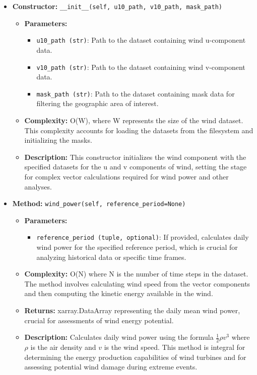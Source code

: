 \documentclass[a4paper,12pt]{article}
\begin{document}
\begin{itemize}
    \item \textbf{Constructor:} \texttt{\_\_init\_\_(self, u10\_path, v10\_path, mask\_path)}
    \begin{itemize}
        \item \textbf{Parameters:}
        \begin{itemize}
            \item \texttt{u10\_path (str)}: Path to the dataset containing wind u-component data.
            \item \texttt{v10\_path (str)}: Path to the dataset containing wind v-component data.
            \item \texttt{mask\_path (str)}: Path to the dataset containing mask data for filtering the geographic area of interest.
        \end{itemize}
        \item \textbf{Complexity:} O(W), where W represents the size of the wind dataset. This complexity accounts for loading the datasets from the filesystem and initializing the masks.
        \item \textbf{Description:} This constructor initializes the wind component with the specified datasets for the u and v components of wind, setting the stage for complex vector calculations required for wind power and other analyses.
    \end{itemize}

    \item \textbf{Method:} \texttt{wind\_power(self, reference\_period=None)}
    \begin{itemize}
        \item \textbf{Parameters:}
        \begin{itemize}
            \item \texttt{reference\_period (tuple, optional)}: If provided, calculates daily wind power for the specified reference period, which is crucial for analyzing historical data or specific time frames.
        \end{itemize}
        \item \textbf{Complexity:} O(N) where N is the number of time steps in the dataset. The method involves calculating wind speed from the vector components and then computing the kinetic energy available in the wind.
        \item \textbf{Returns:} xarray.DataArray representing the daily mean wind power, crucial for assessments of wind energy potential.
        \item \textbf{Description:} Calculates daily wind power using the formula \( \frac{1}{2} \rho v^3 \) where \( \rho \) is the air density and \( v \) is the wind speed. This method is integral for determining the energy production capabilities of wind turbines and for assessing potential wind damage during extreme events.
    \end{itemize}


\end{itemize}
\end{document}
